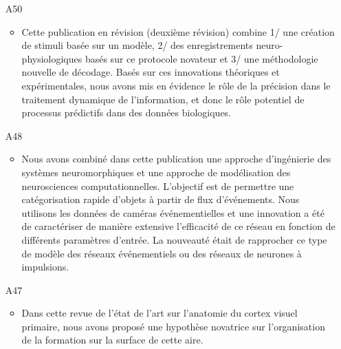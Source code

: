 \begin{enumerate}
%

\item[A50] %
\begin{itemize}
  \item Cette publication en révision (deuxième révision) combine 1/ une création de stimuli basée sur un modèle, 2/ des enregistrements neuro-physiologiques basés sur ce protocole novateur et 3/ une méthodologie nouvelle de décodage. Basés sur ces innovations théoriques et expérimentales, nous avons mis en évidence le rôle de la précision dans le traitement dynamique de l'information, et donc le rôle potentiel de processus prédictifs dans des données biologiques.
\end{itemize}

\item[A48] %
\begin{itemize}
  \item Nous avons combiné dans cette publication une approche d'ingénierie des systèmes neuromorphiques et une approche de modélisation des neurosciences computationnelles. L'objectif est de permettre une catégorisation rapide d'objets à partir de flux d'événements. Nous utilisons les données de caméras événementielles et une innovation a été de caractériser de manière extensive l'efficacité de ce réseau en fonction de différents paramètres d'entrée. La nouveauté était de rapprocher ce type de modèle des réseaux événementiels ou des réseaux de neurones à impulsions.
\end{itemize}

%
%

\item[A47] %
%
\begin{itemize}
  \item Dans cette revue de l'état de l'art sur l'anatomie du cortex visuel primaire, nous avons proposé une hypothèse novatrice sur l'organisation de la formation sur la surface de cette aire.
\end{itemize}


\end{enumerate}

